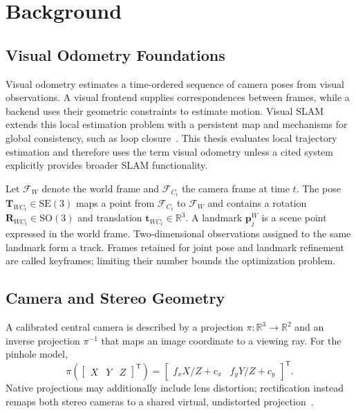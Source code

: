 
\chapter{Background}\label{chapter:background}

\section{Visual Odometry Foundations}

Visual odometry estimates a time-ordered sequence of camera poses from visual observations. A visual frontend supplies correspondences between frames, while a backend uses their geometric constraints to estimate motion. Visual SLAM extends this local estimation problem with a persistent map and mechanisms for global consistency, such as loop closure~\cite{cadena2016past}. This thesis evaluates local trajectory estimation and therefore uses the term visual odometry unless a cited system explicitly provides broader SLAM functionality.

Let $\mathcal{F}_W$ denote the world frame and $\mathcal{F}_{C_t}$ the camera frame at time $t$. The pose $\mathbf{T}_{WC_t}\in\mathrm{SE}(3)$ maps a point from $\mathcal{F}_{C_t}$ to $\mathcal{F}_W$ and contains a rotation $\mathbf{R}_{WC_t}\in\mathrm{SO}(3)$ and translation $\mathbf{t}_{WC_t}\in\mathbb{R}^3$. A landmark $\mathbf{p}_j^W$ is a scene point expressed in the world frame. Two-dimensional observations assigned to the same landmark form a track. Frames retained for joint pose and landmark refinement are called keyframes; limiting their number bounds the optimization problem.

\section{Camera and Stereo Geometry}

A calibrated central camera is described by a projection $\pi:\mathbb{R}^3\rightarrow\mathbb{R}^2$ and an inverse projection $\pi^{-1}$ that maps an image coordinate to a viewing ray. For the pinhole model,
\begin{equation}
  \pi\!\left(\begin{bmatrix}X&Y&Z\end{bmatrix}^{\mathsf T}\right)
  = \begin{bmatrix}f_x X/Z+c_x & f_y Y/Z+c_y\end{bmatrix}^{\mathsf T}.
\end{equation}
Native projections may additionally include lens distortion; rectification instead remaps both stereo cameras to a shared virtual, undistorted projection~\cite{hartley2004multiple}.

